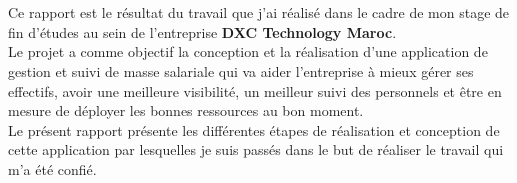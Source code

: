 \titlespacing*{\chapter}{0pt}{1.80in}{0in}
\chapter*{}
\titlespacing*{\chapter}{0pt}{0.45in}{0.3in}%
\vspace{1in}

Ce rapport est le résultat du travail que j'ai réalisé dans le cadre de mon stage de fin d'études au sein de l'entreprise \textbf{DXC Technology Maroc}.\\

Le projet a comme objectif la conception et la réalisation d'une application de gestion et suivi de masse salariale qui va aider l'entreprise à mieux gérer ses effectifs, avoir une meilleure visibilité, un meilleur suivi des personnels et être en mesure de déployer les bonnes ressources au bon moment.\\ 

Le présent rapport présente les différentes étapes de réalisation et conception de cette application par lesquelles je suis passés dans le but de réaliser le travail qui m'a été confié.